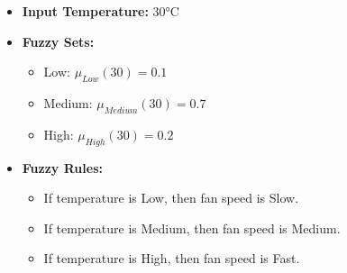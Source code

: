 \documentclass[12pt,a4paper]{article}
\begin{document}
\begin{itemize}
    \item \textbf{Input Temperature:} 30°C

    \item \textbf{Fuzzy Sets:}
    \begin{itemize}
        \item Low: $\mu_{Low}(30)=0.1$ 

        \item Medium: $\mu_{Medium}(30)=0.7$

        \item High: $\mu_{High}(30)=0.2$
        
    \end{itemize}
\item \textbf{Fuzzy Rules:}
\begin{itemize}
    \item If temperature is Low, then fan speed is Slow.
   
    \item  If temperature is Medium, then fan speed is Medium.

    \item If temperature is High, then fan speed is Fast.
    
\end{itemize}
    
\end{itemize}
\end{document}
